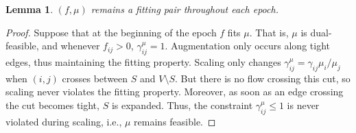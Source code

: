 \documentclass[11pt]{article}
\newtheorem{lemma}[theorem]{Lemma}
\theoremstyle{definition}
\theoremstyle{definition}
\theoremstyle{definition}
\newcommand{\fu}{f^{\mu}}
\newcommand{\nfiu}{\nabla \fu_i}
\newcommand{\biu}{b_{i}^{\mu}}
\newcommand{\gij}{\gamma_{ij}}
\newcommand{\giij}{\gamma_{ij}^{\mu}}
\newcommand{\vsrc}{V^{s}}
\newcommand{\fp}{(f,\mu)}
\DeclareMathOperator{\Ex}{Ex}
\renewcommand{\todo}[1]{\hl{TODO: #1}}
\begin{document}
%
%
%
    \begin{lemma}
        \label{lem:still-fit}
        $\fp$ remains a fitting pair throughout each epoch.
    \end{lemma}
    \begin{proof}
    Suppose that at the beginning of the epoch $f$ fits $\mu$. That is, $\mu$
    is dual-feasible, and whenever
    $f_{ij} > 0$, $\giij = 1$. Augmentation only occurs along tight edges, thus
    maintaining the fitting property. Scaling only changes $\giij = \gij \mu_i / \mu_j$
    when $(i, j)$ crosses between $S$ and $V \setminus S$. But there is no flow crossing
    this cut, so scaling never violates the fitting property. Moreover, as soon as an edge
    crossing the cut becomes tight, $S$ is expanded. Thus, the constraint
    $\giij \leq 1$ is never violated during scaling, i.e., $\mu$ remains feasible.
    \end{proof}
\end{document}
